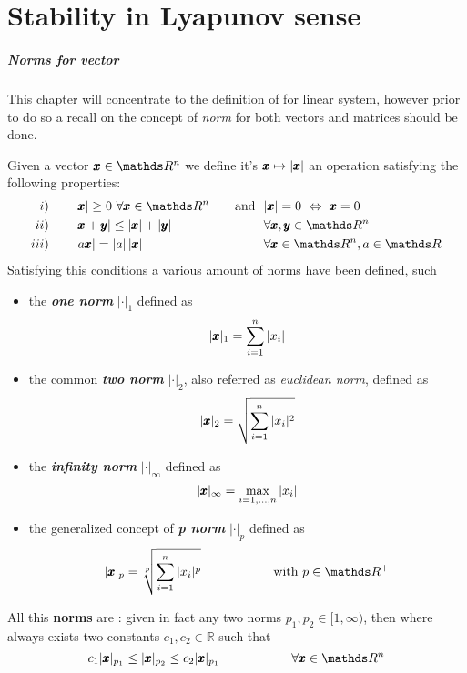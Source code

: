 \chapter{Stability in Lyapunov sense}
	\paragraph{Norms for vector} This chapter will concentrate to the definition of \textit{} for linear system, however prior to do so a recall on the concept of \textit{norm} for both vectors and matrices should be done.
	
	Given a vector $\x \in \mathds R^n$ we define it's  $\pmb{x} \mapsto |\pmb{x}|$ an operation satisfying the following properties:
	\begin{align*}
		i) & \qquad |\x| \geq 0 \ \forall \x \in \mathds R^n \quad &\textrm{and } \ &  |\x| = 0 \ \Leftrightarrow \ \x = 0 \\
		ii) & \qquad |\x + \y| \leq |\x| +|\y| && \forall \x,\y \in \mathds R^n \\
		iii) & \qquad |a \x| = |a| \, |\x| && \forall \x\in \mathds R^n,a\in \mathds R
 	\end{align*}
	Satisfying this conditions a various amount of norms have been defined, such
	\begin{itemize}
		\item the \textbf{\textit{one norm}} $|\cdot|_1$ defined as
		\begin{equation}
			|\pmb{x}|_1 = \sum_{i=1}^n |x_i|
		\end{equation}
		\item the common \textbf{\textit{two norm}} $|\cdot|_2$, also referred as \textit{euclidean norm}, defined as
		\begin{equation} \label{eq:ly:temp1}
			|\pmb{x}|_2 = \sqrt{\sum_{i=1}^n |x_i|^2}
		\end{equation}
		\item the \textit{\textbf{infinity norm}} $|\cdot|_\infty$ defined as
		\begin{equation}
			|\pmb{x}|_\infty = \max_{i=1,\dots,n} |x_i|
		\end{equation}
		\item the generalized concept of \textit{\textbf{p norm}} $|\cdot|_p$ defined as
		\begin{equation}
			|\x|_p = \sqrt[p]{\sum_{i=1}^n |x_i|^p} \hspace{2cm} \textrm{with } p \in \mathds R^+
		\end{equation}	
	\end{itemize}
	All this \textbf{norms} are : given in fact any two norms $p_1, p_2 \in  [1,\infty)$, then where always exists two constants $c_1,c_2 \in \mathds R$ such that
	\[ c_1 |\x|_{p_1} \leq |\x|_{p_2} \leq c_2 |\x|_{p_1} \hspace{2cm} \forall \x \in \mathds R^n \]
	

